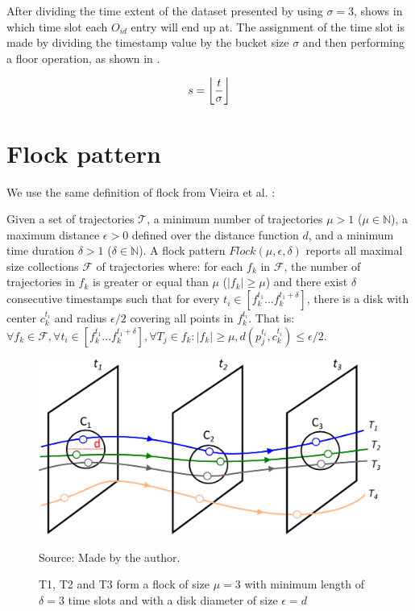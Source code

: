 After dividing the time extent of the dataset presented by  using $\sigma = 3$,
 shows in which time slot each $O_{id}$ entry will end up at. The assignment of the time slot is
made by dividing the timestamp value by the bucket size $\sigma$ and then performing a floor operation, as shown in
.

\begin{equation}
    \label{eq:timeslot}
    s = \floor*{\frac{t}{\sigma}}
\end{equation}

\section{Flock pattern}
\label{sec:tech_flock}
We use the same definition of flock from Vieira et al. \citep{vieira}:

\begin{Def}
\label{def:flock}
Given a set of trajectories $\mathcal{T}$, a minimum number of trajectories $\mu > 1$ ($\mu \in \mathbb{N}$), a maximum
distance $\epsilon > 0$ defined over the distance function $d$, and a minimum time duration $\delta > 1$ ($\delta \in
\mathbb{N}$). A flock pattern $Flock (\mu, \epsilon, \delta)$ reports all maximal size collections $\mathcal{F}$ of
trajectories where: for each $f_k$ in $\mathcal{F}$, the number of trajectories in $f_k$ is greater or equal than $\mu$
($|f_k| \ge \mu$) and there exist $\delta$ consecutive timestamps such that for every $t_i \in [f_k^{t_1}...f_k^{t_1 +
\delta}]$, there is a disk with center $c_k^{t_i}$ and radius $\epsilon/2$ covering all points in $f_k^{t_i}$. That is:
$\forall f_k \in \mathcal{F}, \forall t_i \in [f_k^{t_1}...f_k^{t_1 + \delta}], \forall T_j \in f_k: |f_k | \ge \mu,
d(p_j^{t_i},c_k^{t_i}) \le \epsilon/2$.
\end{Def}

\begin{figure}[h!]
    \centering
    \caption{T1, T2 and T3 form a flock of size $\mu =3$ with minimum length of $\delta = 3$ time slots and with a disk
        diameter of size $\epsilon = d$}
    \centerline{\includegraphics[width=\textwidth]{images/flock.eps}}
    \footnotesize{Source: Made by the author.}
    \label{fig:flock2}
\end{figure}

